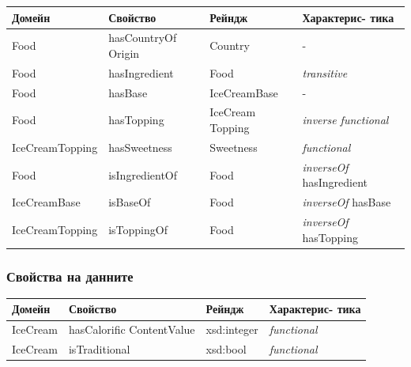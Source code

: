 \documentclass[12pt]{article}
\begin{document}
            \begin{table}[htbp]
                \centering
                \begin{tabularx}{\textwidth}{| X | X | X | X |}
                    \hline
                    \textbf{Домейн}          & \textbf{Свойство}     & \textbf{Рейндж}     & \textbf{Характерис- тика}         \\ \hline
                            
                    Food            & hasCountryOf Origin & Country         &           -                         \\ \hline
                    Food            & hasIngredient      & Food             & \textit{transitive}                 \\ \hline
                    Food            & hasBase            & IceCreamBase     &           -                         \\ \hline
                    Food            & hasTopping         & IceCream Topping & \textit{inverse functional}         \\ \hline
                    IceCreamTopping & hasSweetness       & Sweetness        & \textit{functional}                 \\ \hline
                    Food            & isIngredientOf     & Food             & \textit{inverseOf} hasIngredient    \\ \hline
                    IceCreamBase    & isBaseOf           & Food             & \textit{inverseOf} hasBase          \\ \hline
                    IceCreamTopping & isToppingOf        & Food             & \textit{inverseOf} hasTopping       \\ \hline
                            
                \end{tabularx}
            \end{table}
    
        \subsubsection{Свойства на данните}
    
            \begin{table}[htbp]
                \centering
                \begin{tabularx}{\textwidth}{| X | X | X | X |}
                    \hline
                    \textbf{Домейн}          & \textbf{Свойство}     & \textbf{Рейндж}     & \textbf{Характерис- тика}         \\ \hline
                            
                    IceCream            & hasCalorific ContentValue & xsd:integer         &       \textit{functional}          \\ \hline
                    IceCream            & isTraditional & xsd:bool         &       \textit{functional}          \\ \hline
                            
                \end{tabularx}
            \end{table}
    
\end{document}
